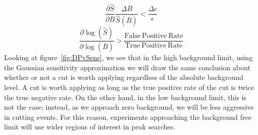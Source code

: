 \documentclass[/main.tex]{subfiles}
\begin{document}
\begin{equation} \label{eq:cutcriterion}
  \frac{\partial\hat{S}}{\partial\overline{B}} \frac{\Delta\overline{B}}{\hat{S}(\overline{B})} < \frac{\Delta\epsilon}{\epsilon}
\end{equation}
\begin{equation}
  \frac{\partial\log(\hat{S})}{\partial\log(\overline{B})} > \frac{\mathrm{False~Positive~Rate}}{\mathrm{True~Positive~Rate}}
\end{equation}
Looking at figure~\ref{fig:DPvSens}, we see that in the high background limit, using the Gaussian sensitivity approximation we will draw the same conclusion about whether or not a cut is worth applying regardless of the absolute background level.
A cut is worth applying as long as the true positive rate of the cut is twice the true negative rate.
On the other hand, in the low background limit, this is not the case; instead, as we approach zero background, we will be less aggressive in cutting events.
For this reason, experiments approaching the background free limit will use wider regions of interest in peak searches.

\onlyinsubfile{
  
  
}
\end{document}
